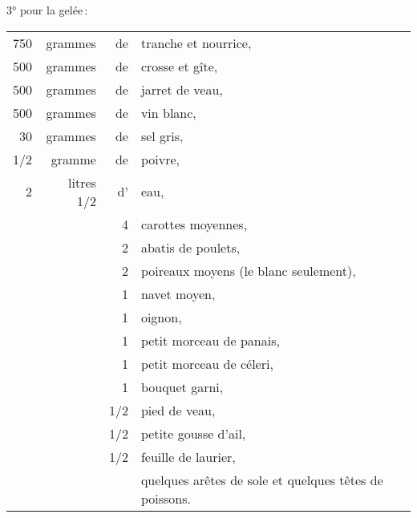 \medskip

3° pour la gelée :

\medskip

\footnotesize
\begin{longtable}{rrrp{16em}}
    750 & grammes    & de & tranche et nourrice,                                                          \\
    500 & grammes    & de & crosse et gîte,                                                               \\
    500 & grammes    & de & jarret de veau,                                                               \\
    500 & grammes    & de & vin blanc,                                                                    \\
     30 & grammes    & de & sel gris,                                                                     \\
    1/2 & gramme     & de & poivre,                                                                       \\
      2 & litres 1/2 & d’ & eau,                                                                          \\
        &            &  4 & carottes moyennes,                                                            \\
        &            &  2 & abatis de poulets,                                                            \\
        &            &  2 & poireaux moyens (le blanc seulement),                                         \\
        &            &  1 & navet moyen,                                                                  \\
        &            &  1 & oignon,                                                                       \\
        &            &  1 & petit morceau de panais,                                                      \\
        &            &  1 & petit morceau de céleri,                                                      \\
        &            &  1 & bouquet garni,                                                                \\
        &            &1/2 & pied de veau,                                                                 \\
        &            &1/2 & petite gousse d'ail,                                                          \\
        &            &1/2 & feuille de laurier,                                                           \\
        &            &    & quelques arêtes de sole et quelques têtes de poissons.                        \\
\end{longtable}
\normalsize

